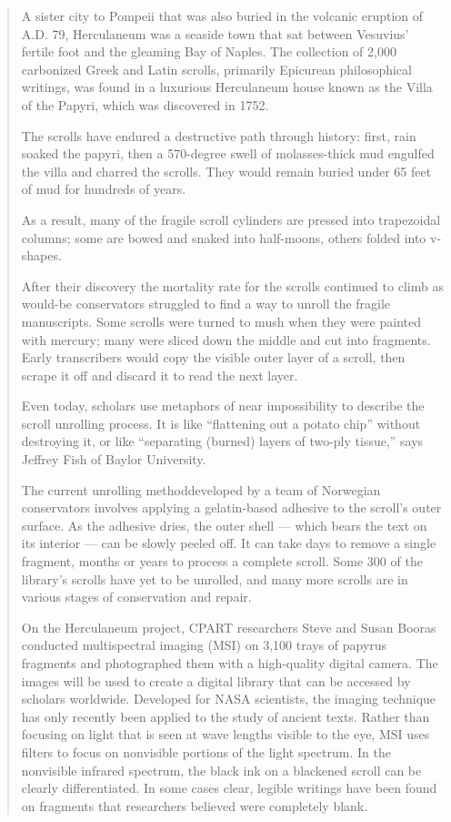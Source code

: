 \documentclass{article}
\begin{document}
\begin{quote}
A sister city to Pompeii that was also buried in the volcanic eruption
of A.D. 79, Herculaneum was a seaside town that sat between Vesuvius'
fertile foot and the gleaming Bay of Naples. The collection of 2,000
carbonized Greek and Latin scrolls, primarily Epicurean philosophical
writings, was found in a luxurious Herculaneum house known as the Villa
of the Papyri, which was discovered in 1752.

The scrolls have endured a destructive path through history: first, rain
soaked the papyri, then a 570-degree swell of molasses-thick mud
engulfed the villa and charred the scrolls. They would remain buried
under 65 feet of mud for hundreds of years.

As a result, many of the fragile scroll cylinders are pressed into
trapezoidal columns; some are bowed and snaked into half-moons, others
folded into v-shapes.

After their discovery the mortality rate for the scrolls continued to
climb as would-be conservators struggled to find a way to unroll the
fragile manuscripts. Some scrolls were turned to mush when they were
painted with mercury; many were sliced down the middle and cut into
fragments. Early transcribers would copy the visible outer layer of a
scroll, then scrape it off and discard it to read the next layer.

Even today, scholars use metaphors of near impossibility to describe the
scroll unrolling process. It is like ``flattening out a potato chip''
without destroying it, or like ``separating (burned) layers of two-ply
tissue,'' says Jeffrey Fish of Baylor University.

The current unrolling methoddeveloped by a team of Norwegian
conservators involves applying a gelatin-based adhesive to the scroll's
outer surface. As the adhesive dries, the outer shell --- which bears
the text on its interior --- can be slowly peeled off. It can take days
to remove a single fragment, months or years to process a complete
scroll. Some 300 of the library's scrolls have yet to be unrolled, and
many more scrolls are in various stages of conservation and repair.

On the Herculaneum project, CPART researchers Steve and Susan Booras
conducted multispectral imaging (MSI) on 3,100 trays of papyrus
fragments and photographed them with a high-quality digital camera. The
images will be used to create a digital library that can be accessed by
scholars worldwide. Developed for NASA scientists, the imaging technique
has only recently been applied to the study of ancient texts. Rather
than focusing on light that is seen at wave lengths visible to the eye,
MSI uses filters to focus on nonvisible portions of the light spectrum.
In the nonvisible infrared spectrum, the black ink on a blackened scroll
can be clearly differentiated. In some cases clear, legible writings
have been found on fragments that researchers believed were completely
blank.
\end{quote}
\end{document}
